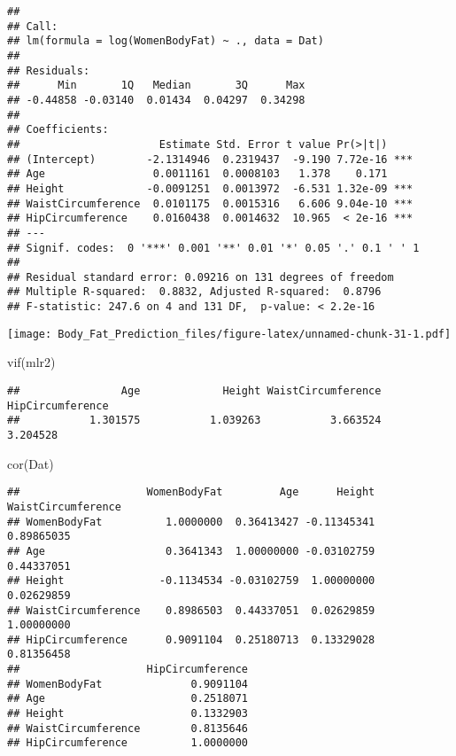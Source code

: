 \documentclass[
]{article}
\newenvironment{Shaded}{\begin{snugshade}}{\end{snugshade}}
\newcommand{\DocumentationTok}[1]{\textcolor[rgb]{0.56,0.35,0.01}{\textbf{\textit{#1}}}}
\newcommand{\FunctionTok}[1]{\textcolor[rgb]{0.00,0.00,0.00}{#1}}
\newcommand{\NormalTok}[1]{#1}
\newcommand{\SpecialCharTok}[1]{\textcolor[rgb]{0.00,0.00,0.00}{#1}}
\begin{document}
\begin{verbatim}
## 
## Call:
## lm(formula = log(WomenBodyFat) ~ ., data = Dat)
## 
## Residuals:
##      Min       1Q   Median       3Q      Max 
## -0.44858 -0.03140  0.01434  0.04297  0.34298 
## 
## Coefficients:
##                      Estimate Std. Error t value Pr(>|t|)    
## (Intercept)        -2.1314946  0.2319437  -9.190 7.72e-16 ***
## Age                 0.0011161  0.0008103   1.378    0.171    
## Height             -0.0091251  0.0013972  -6.531 1.32e-09 ***
## WaistCircumference  0.0101175  0.0015316   6.606 9.04e-10 ***
## HipCircumference    0.0160438  0.0014632  10.965  < 2e-16 ***
## ---
## Signif. codes:  0 '***' 0.001 '**' 0.01 '*' 0.05 '.' 0.1 ' ' 1
## 
## Residual standard error: 0.09216 on 131 degrees of freedom
## Multiple R-squared:  0.8832, Adjusted R-squared:  0.8796 
## F-statistic: 247.6 on 4 and 131 DF,  p-value: < 2.2e-16
\end{verbatim}

\begin{Shaded}
\end{Shaded}

\texttt{[image: Body\_Fat\_Prediction\_files/figure-latex/unnamed-chunk-31-1.pdf]}

\begin{Shaded}
\begin{Highlighting}[]
\FunctionTok{vif}\NormalTok{(mlr2)}
\end{Highlighting}
\end{Shaded}

\begin{verbatim}
##                Age             Height WaistCircumference   HipCircumference 
##           1.301575           1.039263           3.663524           3.204528
\end{verbatim}

\begin{Shaded}
\begin{Highlighting}[]
\FunctionTok{cor}\NormalTok{(Dat)}
\end{Highlighting}
\end{Shaded}

\begin{verbatim}
##                    WomenBodyFat         Age      Height WaistCircumference
## WomenBodyFat          1.0000000  0.36413427 -0.11345341         0.89865035
## Age                   0.3641343  1.00000000 -0.03102759         0.44337051
## Height               -0.1134534 -0.03102759  1.00000000         0.02629859
## WaistCircumference    0.8986503  0.44337051  0.02629859         1.00000000
## HipCircumference      0.9091104  0.25180713  0.13329028         0.81356458
##                    HipCircumference
## WomenBodyFat              0.9091104
## Age                       0.2518071
## Height                    0.1332903
## WaistCircumference        0.8135646
## HipCircumference          1.0000000
\end{verbatim}
\end{document}
